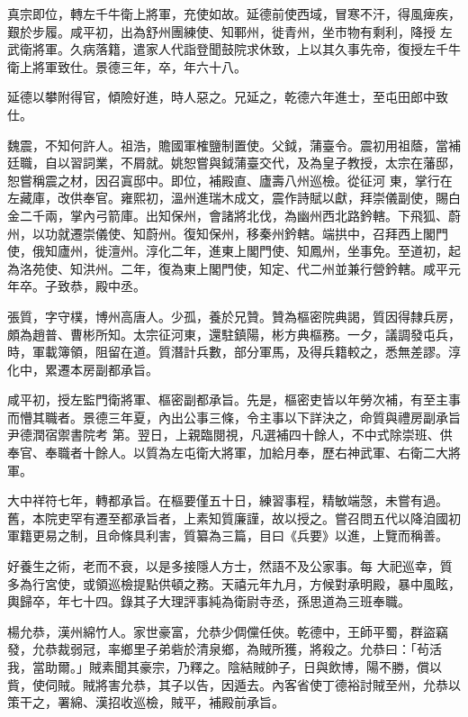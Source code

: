 \begin{pinyinscope}
 真宗即位，轉左千牛衛上將軍，充使如故。延德前使西域，冒寒不汗，得風痺疾，艱於步履。咸平初，出為舒州團練使、知鄆州，徙青州，坐市物有剩利，降授
 左武衛將軍。久病落籍，遣家人代詣登聞鼓院求休致，上以其久事先帝，復授左千牛衛上將軍致仕。景德三年，卒，年六十八。



 延德以攀附得官，傾險好進，時人惡之。兄延之，乾德六年進士，至屯田郎中致仕。



 魏震，不知何許人。祖浩，贍國軍榷鹽制置使。父鉞，蒲臺令。震初用祖蔭，當補廷職，自以習詞業，不屑就。姚恕嘗與鉞蒲臺交代，及為皇子教授，太宗在藩邸，恕嘗稱震之材，因召寘邸中。即位，補殿直、廬壽八州巡檢。從征河
 東，掌行在左藏庫，改供奉官。雍熙初，溫州進瑞木成文，震作詩賦以獻，拜崇儀副使，賜白金二千兩，掌內弓箭庫。出知保州，會諸將北伐，為幽州西北路鈐轄。下飛狐、蔚州，以功就遷崇儀使、知蔚州。復知保州，移秦州鈐轄。端拱中，召拜西上閣門使，俄知廬州，徙澶州。淳化二年，進東上閣門使、知鳳州，坐事免。至道初，起為洛苑使、知洪州。二年，復為東上閣門使，知定、代二州並兼行營鈐轄。咸平元年卒。子致恭，殿中丞。



 張質，字守樸，博州高唐人。少孤，養於兄贊。贊為樞密院典謁，質因得隸兵房，頗為趙普、曹彬所知。太宗征河東，還駐鎮陽，彬方典樞務。一夕，議調發屯兵，時，軍載簿領，阻留在道。質潛計兵數，部分軍馬，及得兵籍較之，悉無差謬。淳化中，累遷本房副都承旨。



 咸平初，授左監門衛將軍、樞密副都承旨。先是，樞密吏皆以年勞次補，有至主事而懵其職者。景德三年夏，內出公事三條，令主事以下詳決之，命質與禮房副承旨尹德潤宿禦書院考
 第。翌日，上親臨閱視，凡選補四十餘人，不中式除崇班、供奉官、奉職者十餘人。以質為左屯衛大將軍，加給月奉，歷右神武軍、右衛二大將軍。



 大中祥符七年，轉都承旨。在樞要僅五十日，練習事程，精敏端愨，未嘗有過。舊，本院吏罕有遷至都承旨者，上素知質廉謹，故以授之。嘗召問五代以降洎國初軍籍更易之制，且命條具利害，質纂為三篇，目曰《兵要》以進，上覽而稱善。



 好養生之術，老而不衰，以是多接隱人方士，然語不及公家事。每
 大祀巡幸，質多為行宮使，或領巡檢提點供頓之務。天禧元年九月，方候對承明殿，暴中風眩，輿歸卒，年七十四。錄其子大理評事純為衛尉寺丞，孫思道為三班奉職。



 楊允恭，漢州綿竹人。家世豪富，允恭少倜儻任俠。乾德中，王師平蜀，群盜竊發，允恭裁弱冠，率鄉里子弟砦於清泉鄉，為賊所獲，將殺之。允恭曰：「茍活我，當助爾。」賊素聞其豪宗，乃釋之。陰結賊帥子，日與飲博，陽不勝，償以
 貲，使伺賊。賊將害允恭，其子以告，因遁去。內客省使丁德裕討賊至州，允恭以策干之，署綿、漢招收巡檢，賊平，補殿前承旨。




\end{pinyinscope}
